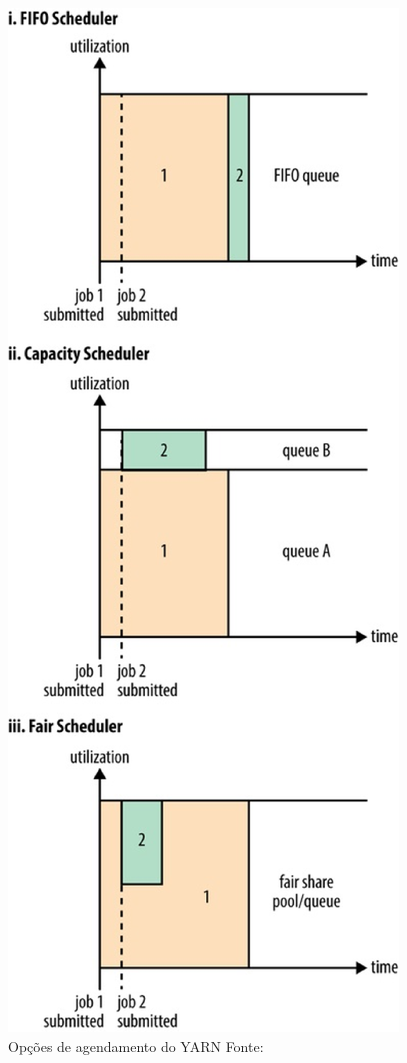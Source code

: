                 \begin{figure}[ht!]
                        \centering
                        \includegraphics[keepaspectratio=true,scale=0.30]
                            {figuras/figura8.eps}
                        \caption[Opções de agendamento do YARN]{Opções de agendamento do YARN
                        \protect \linebreak Fonte: }
                        \label{figura8}
                 \end{figure}


